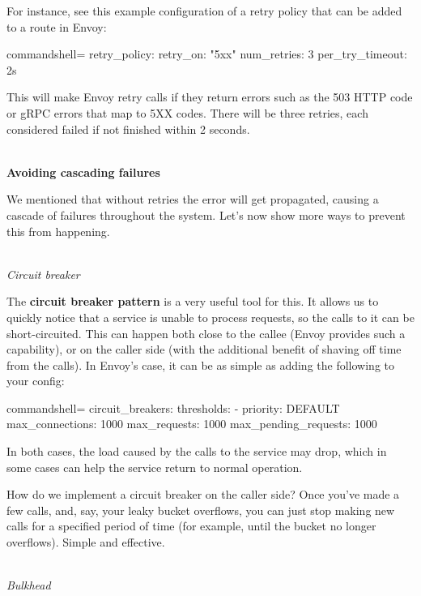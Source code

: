 For instance, see this example configuration of a retry policy that can be added to a route in Envoy:


\begin{tcblisting}{commandshell={}}
retry_policy:
  retry_on: "5xx"
  num_retries: 3
  per_try_timeout: 2s

\end{tcblisting}

This will make Envoy retry calls if they return errors such as the 503 HTTP code or gRPC errors that map to 5XX codes. There will be three retries, each considered failed if not finished within 2 seconds.

\hspace*{\fill} \\ %
\noindent
\textbf{Avoiding cascading failures}

We mentioned that without retries the error will get propagated, causing a cascade of failures throughout the system. Let's now show more ways to prevent this from happening.

\hspace*{\fill} \\ %
\noindent
\textit{Circuit breaker}

The \textbf{circuit breaker pattern} is a very useful tool for this. It allows us to quickly notice that a service is unable to process requests, so the calls to it can be short-circuited. This can happen both close to the callee (Envoy provides such a capability), or on the caller side (with the additional benefit of shaving off time from the calls). In Envoy's case, it can be as simple as adding the following to your config:


\begin{tcblisting}{commandshell={}}
circuit_breakers:
  thresholds:
	- priority: DEFAULT
	  max_connections: 1000
	  max_requests: 1000
	  max_pending_requests: 1000
\end{tcblisting}

In both cases, the load caused by the calls to the service may drop, which in some cases can help the service return to normal operation.

How do we implement a circuit breaker on the caller side? Once you've made a few calls, and, say, your leaky bucket overflows, you can just stop making new calls for a specified period of time (for example, until the bucket no longer overflows). Simple and effective.


\hspace*{\fill} \\ %
\noindent
\textit{Bulkhead}


